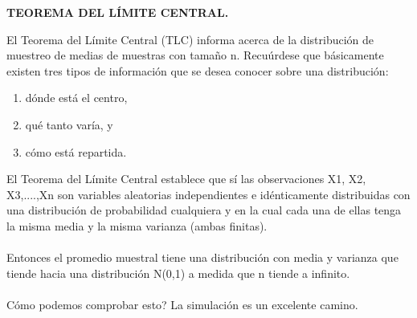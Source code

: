 \documentclass[12pt,letterpaper]{article}\usepackage[]{graphicx}\usepackage[]{color}
\begin{document}
\begin{center}
\textbf{TEOREMA DEL L\'IMITE CENTRAL.}
\end{center}
El Teorema del L\'imite Central (TLC) informa acerca de la distribuci\'on de muestreo de medias de muestras con tama\~no n. Recuúrdese que básicamente existen tres tipos de informaci\'on que se desea conocer sobre una distribuci\'on:
\begin{enumerate}
  \item d\'onde está el centro,
  \item qué tanto var\'ia, y
  \item c\'omo está repartida.
\end{enumerate}

El Teorema del L\'imite Central establece que s\'i las observaciones X1, X2, X3,....,Xn son variables aleatorias independientes e id\'enticamente distribuidas con una distribuci\'on de probabilidad cualquiera y en la cual cada una de ellas tenga la misma media y la misma varianza (ambas finitas).\\

\\ Entonces el promedio muestral tiene una distribuci\'on con media y varianza que tiende hacia una distribución N(0,1) a medida que n tiende a infinito.\\

\\ C\'omo podemos comprobar esto? La simulaci\'on es un excelente camino.
\end{document}
